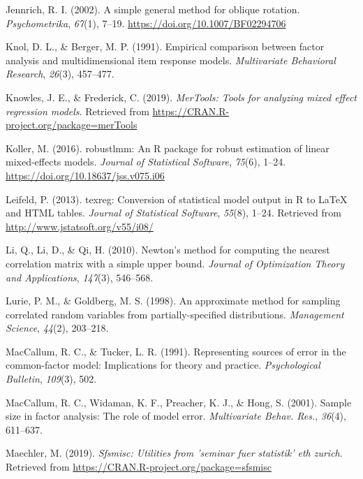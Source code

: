 \documentclass[
  english,
  man]{apa6}
\begin{document}
\leavevmode\hypertarget{ref-jennrich2002}{}%
Jennrich, R. I. (2002). A simple general method for oblique rotation. \emph{Psychometrika}, \emph{67}(1), 7--19. \url{https://doi.org/10.1007/BF02294706}

\leavevmode\hypertarget{ref-knol1991}{}%
Knol, D. L., \& Berger, M. P. (1991). Empirical comparison between factor analysis and multidimensional item response models. \emph{Multivariate Behavioral Research}, \emph{26}(3), 457--477.

\leavevmode\hypertarget{ref-R-merTools}{}%
Knowles, J. E., \& Frederick, C. (2019). \emph{MerTools: Tools for analyzing mixed effect regression models}. Retrieved from \url{https://CRAN.R-project.org/package=merTools}

\leavevmode\hypertarget{ref-robustlmm}{}%
Koller, M. (2016). robustlmm: An R package for robust estimation of linear mixed-effects models. \emph{Journal of Statistical Software}, \emph{75}(6), 1--24. \url{https://doi.org/10.18637/jss.v075.i06}

\leavevmode\hypertarget{ref-R-texreg}{}%
Leifeld, P. (2013). texreg: Conversion of statistical model output in R to LaTeX and HTML tables. \emph{Journal of Statistical Software}, \emph{55}(8), 1--24. Retrieved from \url{http://www.jstatsoft.org/v55/i08/}

\leavevmode\hypertarget{ref-li2010}{}%
Li, Q., Li, D., \& Qi, H. (2010). Newton's method for computing the nearest correlation matrix with a simple upper bound. \emph{Journal of Optimization Theory and Applications}, \emph{147}(3), 546--568.

\leavevmode\hypertarget{ref-lurie1998}{}%
Lurie, P. M., \& Goldberg, M. S. (1998). An approximate method for sampling correlated random variables from partially-specified distributions. \emph{Management Science}, \emph{44}(2), 203--218.

\leavevmode\hypertarget{ref-maccallum1991representing}{}%
MacCallum, R. C., \& Tucker, L. R. (1991). Representing sources of error in the common-factor model: Implications for theory and practice. \emph{Psychological Bulletin}, \emph{109}(3), 502.

\leavevmode\hypertarget{ref-maccallum2001}{}%
MacCallum, R. C., Widaman, K. F., Preacher, K. J., \& Hong, S. (2001). Sample size in factor analysis: The role of model error. \emph{Multivariate Behav. Res.}, \emph{36}(4), 611--637.

\leavevmode\hypertarget{ref-R-sfsmisc}{}%
Maechler, M. (2019). \emph{Sfsmisc: Utilities from 'seminar fuer statistik' eth zurich}. Retrieved from \url{https://CRAN.R-project.org/package=sfsmisc}
\end{document}
